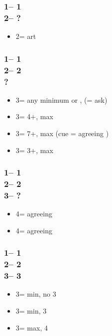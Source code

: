 \documentclass[12pt, a4paper]{article}
\begin{document}
\subsubsection*{1\hearts -- 1\spades\\
                2\hearts -- ?}
\begin{itemize}
    \item 2\nt = \invp art \vimp
\end{itemize}

\subsubsection*{1\hearts -- 1\spades\\
                2\hearts -- 2\nt\\
                ?}
\begin{itemize}
    \item 3\clubs = any minimum or \nat, \forc (\diams = ask) \vimp
    \item 3\diams = 4+\diams, max
    \item 3\hearts = 7+\hearts, max (cue = agreeing \hearts)
    \item 3\spades = 3+\spades, max
\end{itemize}

\subsubsection*{1\hearts -- 1\spades\\
                2\hearts -- 2\nt\\
                3\spades -- ?}
\begin{itemize}
    \item 4\clubs = agreeing \hearts
    \item 4\diams = agreeing \spades
\end{itemize}

\subsubsection*{1\hearts -- 1\spades\\
                2\hearts -- 2\nt\\
                3\clubs -- 3\diams}
\begin{itemize}
    \item 3\hearts = min, no 3\spades
    \item 3\spades = min, 3\spades
    \item 3\nt = max, 4\clubs
\end{itemize}


\end{document}

